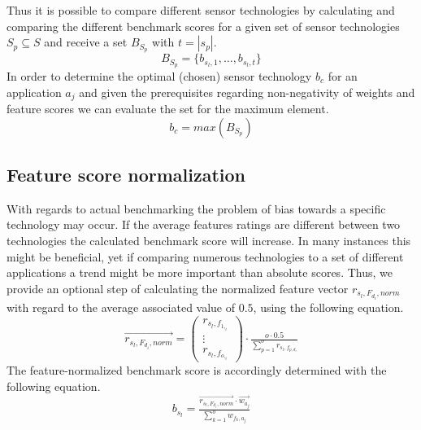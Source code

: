 Thus it is possible to compare different sensor technologies by calculating and comparing the different benchmark scores for a given set of sensor technologies $S_p\subseteq S$ and receive a set $B_{S_p}$ with $t=\left | s_p\right |$.
\begin{equation}
B_{S_p}=\{b_{s_l,1},\hdots,b_{s_l,t}\}
\end{equation}
In order to determine the optimal (chosen) sensor technology $b_c$ for an application $a_j$ and given the prerequisites regarding non-negativity of weights and feature scores we can evaluate the set for the maximum element.
\begin{equation}
b_c=max(B_{S_p})
\end{equation}
\subsection{Feature score normalization}
With regards to actual benchmarking the problem of bias towards a specific technology may occur. If the average features ratings are different between two technologies the calculated benchmark score will increase. In many instances this might be beneficial, yet if comparing numerous technologies to a set of different applications a trend might be more important than absolute scores. Thus, we provide an optional step of calculating the normalized feature vector $r_{s_l,F_{d_i},norm}$ with regard to the average associated value of $0.5$, using the following equation.
\begin{equation}
\overrightarrow{r_{s_l,F_{d_i},norm}}= \begin{pmatrix}
r_{s_l,f_{1,_i}}\\ 
\vdots\\
r_{s_l,f_{o,_i}}
\end{pmatrix}
\cdot \tfrac{o\cdot0.5}{\sum_{p=1}^{o}r_{s_l,f_{p,d_i}}}
\end{equation} 
The feature-normalized benchmark score is accordingly determined with the following equation.
\begin{equation}
b_{s_l}=\tfrac{\overrightarrow{r_{s_l,F_{d_i},norm}}\cdot \overrightarrow{w_{a_j}}}{\sum_{k=1}^{o}w_{f_k,a_j}}
\end{equation}
